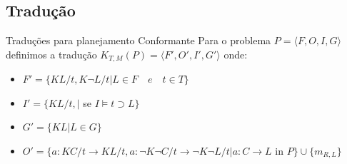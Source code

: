 \subsection{Tradução}
\begin{frame}{Traduções para planejamento Conformante}
Para o problema $P=\langle F, O, I, G\rangle$ definimos a tradução $K_{T,M}(P) = 
\langle F', O', I', G'\rangle$ onde:
\begin{itemize}
\item $F' = \lbrace KL/t, K\lnot L/t \vert L \in F \quad e \quad t \in T 
\rbrace$
\item $I' = \lbrace KL/t, \vert$ se $I \models t \supset L  \rbrace$ 
\item $G' = \lbrace KL \vert L \in G \rbrace$
\item $O' = \lbrace a: KC/t \rightarrow KL/t, a: \lnot K \lnot C / t \rightarrow 
\lnot K \lnot L/t \vert a: C \rightarrow L$ in $P \rbrace \cup \lbrace m_{R,L} 
\rbrace$ 
\end{itemize}
\end{frame}
% 
%         
% 


